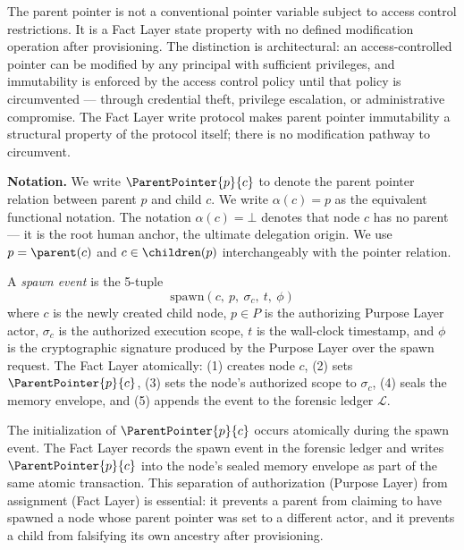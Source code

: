 The parent pointer is not a conventional pointer variable subject to access control restrictions. It is a Fact Layer state property with no defined modification operation after provisioning. The distinction is architectural: an access-controlled pointer can be modified by any principal with sufficient privileges, and immutability is enforced by the access control policy until that policy is circumvented --- through credential theft, privilege escalation, or administrative compromise. The Fact Layer write protocol makes parent pointer immutability a structural property of the protocol itself; there is no modification pathway to circumvent.

\medskip
\noindent\textbf{Notation.} We write $\ParentPointer{p}{c}$ to denote the parent pointer relation between parent $p$ and child $c$. We write $\alpha(c) = p$ as the equivalent functional notation. The notation $\alpha(c) = \bot$ denotes that node $c$ has no parent --- it is the root human anchor, the ultimate delegation origin. We use $p = \parent(c)$ and $c \in \children(p)$ interchangeably with the pointer relation.

\begin{dfn}
\label{dfn:spawn-event}
A \emph{spawn event} is the 5-tuple
\begin{equation}
\mathrm{spawn}(c,\ p,\ \sigma_c,\ t,\ \phi)
\end{equation}
where $c$ is the newly created child node, $p \in P$ is the authorizing Purpose Layer actor, $\sigma_c$ is the authorized execution scope, $t$ is the wall-clock timestamp, and $\phi$ is the cryptographic signature produced by the Purpose Layer over the spawn request. The Fact Layer atomically: (1) creates node $c$, (2) sets $\ParentPointer{p}{c}$, (3) sets the node's authorized scope to $\sigma_c$, (4) seals the memory envelope, and (5) appends the event to the forensic ledger $\mathcal{L}$.
\end{dfn}

The initialization of $\ParentPointer{p}{c}$ occurs atomically during the spawn event. The Fact Layer records the spawn event in the forensic ledger and writes $\ParentPointer{p}{c}$ into the node's sealed memory envelope as part of the same atomic transaction. This separation of authorization (Purpose Layer) from assignment (Fact Layer) is essential: it prevents a parent from claiming to have spawned a node whose parent pointer was set to a different actor, and it prevents a child from falsifying its own ancestry after provisioning.

